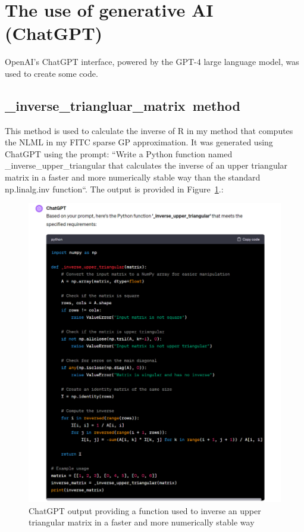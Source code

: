 \documentclass[12pt]{article}
\begin{document}
    \FloatBarrier
    \appendix
    \section{The use of generative AI (ChatGPT)}
    OpenAI's ChatGPT interface, powered by the GPT-4 large language model, was used to create some code.
    \subsection{\_inverse\_triangluar\_matrix\ method}
    This method is used to calculate the inverse of R in my method that computes the NLML in my FITC sparse GP approximation.
    It was generated using ChatGPT using the prompt: ``Write a Python function named \_inverse\_upper\_triangular that calculates the inverse of an upper triangular matrix in a faster and more numerically stable way than the standard np.linalg.inv function``.
    The output is provided in Figure~\ref{fig:chat-iut}.:
    \begin{figure}[htbp]
        \centering
        \includegraphics[width=1\linewidth]{figures/chat-iut/chat-iut.png}
        \caption{ChatGPT output providing a function used to inverse an upper triangular matrix in a faster and more numerically stable way}
        \label{fig:chat-iut}
    \end{figure}
\end{document}
